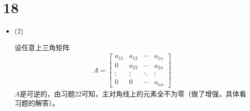\documentclass{article}
\begin{document}
\section*{18}

\begin{itemize}
  \item (2)

        设任意上三角矩阵
        \begin{align*}
          A = \begin{bmatrix}
                a_{11} & a_{12} & \cdots & a_{1n} \\
                0      & a_{22} & \cdots & a_{2n} \\
                \vdots & \vdots & \ddots & \vdots \\
                0      & 0      & \cdots & a_{nn}
              \end{bmatrix}
        \end{align*}
        $A$是可逆的，由习题22可知，主对角线上的元素全不为零（做了增强，具体看习题的解答）。


\end{itemize}
\end{document}
